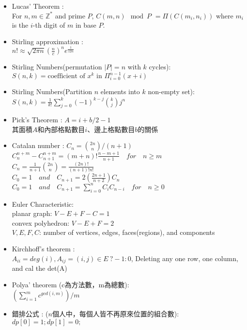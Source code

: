 \begin{itemize}
\item Lucas’ Theorem :\\
  For $n, m \in \mathbb{Z}^{*}$ and prime $P$,
  $C(m,n) \mod P$
	$= \Pi ( C(m_i,n_i) )$
  where $m_i$ is the $i$-th digit of $m$ in base $P$.
\item Stirling approximation : \\
  $n!\approx\sqrt{ 2 \pi n}(\frac{n}{e})^{n}e^\frac{1}{12n}$
\item Stirling Numbers(permutation $|P|=n$ with $k$ cycles): \\
  $S(n,k) = \text{coefficient of }x^k \text{ in } \Pi_{i=0}^{n-1} (x+i)$
\item Stirling Numbers(Partition $n$ elements into $k$ non-empty set): \\
  $S(n,k) = \frac{1}{k!} \sum\limits_{j=0}^k (-1)^{k-j} {k \choose j} j^n$
\item Pick’s Theorem : $A = i + b/2 - 1$\\
  其面積$A$和內部格點數目$i$、邊上格點數目$b$的關係
\item Catalan number : $C_n = {2n \choose n}/(n+1)$\\
  $C^{n+m}_{n}-C^{n+m}_{n+1} = (m+n)! \frac{n-m+1}{n+1}\quad for \quad  n \ge m$\\
  $C_n = \frac{1}{n+1}{2n \choose n} = \frac{(2n)!}{(n+1)!n!}$\\
  $C_0 = 1 \quad  and \quad C_{n+1}= 2(\frac{2n+1}{n+2})C_n$\\
  $C_0 = 1 \quad  and \quad C_{n+1} = \sum_{i=0}^{n} C_iC_{n-i} \quad for \quad  n \ge 0$
\item Euler Characteristic: \\
  planar graph: $V-E+F-C=1$ \\
  convex polyhedron: $V-E+F=2$ \\
  $V,E,F,C$: number of vertices, edges, faces(regions), and components
\item Kirchhoff's theorem : \\
  $A_{ii} = deg(i), A_{ij} = (i,j) \in E\ ? -1 : 0$,
  Deleting any one row, one column, and cal the det(A)
\item Polya' theorem (c為方法數，m為總數): \\
  $(\sum_{i=1}^{m}{c^{gcd(i,m)}})/m$
\item 錯排公式 :  ($n$個人中，每個人皆不再原來位置的組合數): \\
  $dp[0]=1;dp[1]=0;$\\

\end{itemize}
